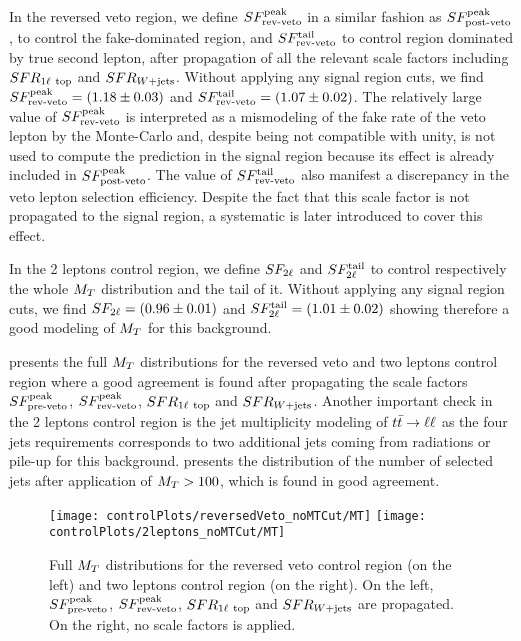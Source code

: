         In the reversed veto region, we define $SF_{\text{rev-veto}}^{\text{peak}}$ in a similar fashion as $SF_{\text{post-veto}}^{\text{peak}}$,
        to control the fake-dominated region, and $SF_{\text{rev-veto}}^{\text{tail}}$ to control region dominated
        by true second lepton, after propagation of all the relevant scale factors including
        $SFR_{1\ell~\text{top}}$ and $SFR_{\text{$W$+jets}}$.
        Without applying any signal region cuts, we find $SF_{\text{rev-veto}}^{\text{peak}} = (1.18 \pm 0.03)$ and
        $SF_{\text{rev-veto}}^{\text{tail}} = (1.07 \pm 0.02)$. The relatively large value of $SF_{\text{rev-veto}}^{\text{peak}}$ is
        interpreted as a mismodeling of the fake rate of the veto lepton by the Monte-Carlo
        and, despite being not compatible with unity, is not used to compute the prediction
        in the signal region because its effect is already included in $SF_{\text{post-veto}}^{\text{peak}}$. The
        value of $SF_{\text{rev-veto}}^{\text{tail}}$ also manifest a discrepancy in the veto lepton selection
        efficiency. Despite the fact that this scale factor is not propagated to the
        signal region, a systematic is later introduced to cover this effect.

        In the 2 leptons control region, we define $SF_{2\ell}$ and $SF_{2\ell}^{\text{tail}}$ to
        control respectively the whole $M_T$ distribution and the tail of it.
        Without applying any signal region cuts, we find $SF_{2\ell} = (0.96 \pm 0.01)$
        and $SF_{2\ell}^{\text{tail}} = (1.01 \pm 0.02)$ showing therefore a good modeling of $M_T$
        for this background.

         presents the full $M_T$ distributions
        for the reversed veto and two leptons control region where a good agreement is
        found after propagating the scale factors $SF_{\text{pre-veto}}^{\text{peak}}$, $SF_{\text{rev-veto}}^{\text{peak}}$, $SFR_{1\ell~\text{top}}$
        and $SFR_{\text{$W$+jets}}$.
        Another important check in the 2 leptons control region is the jet multiplicity
        modeling of $t\bar{t} \rightarrow \ell \ell$ as the four jets requirements corresponds to two
        additional jets coming from radiations or pile-up for this background.
         presents the distribution of the number
        of selected jets after application of $M_T>100$, which is found in good agreement.


        \begin{figure}[h!]
            \centering
            \texttt{[image: controlPlots/reversedVeto\_noMTCut/MT]}
            \texttt{[image: controlPlots/2leptons\_noMTCut/MT]}
            \caption{Full $M_T$ distributions for the reversed veto control region (on the left) and two leptons control region (on the right). On the left, $SF_{\text{pre-veto}}^{\text{peak}}$, $SF_{\text{rev-veto}}^{\text{peak}}$, $SFR_{1\ell~\text{top}}$ and $SFR_{\text{$W$+jets}}$ are propagated. On the right, no scale factors is applied.}
                    \label{fig:preselMT2leptonAndLepPlusVeto}
        \end{figure}

